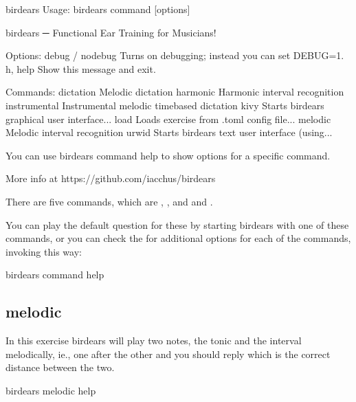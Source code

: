 \documentclass[letterpaper,10pt,english]{sphinxmanual}
\begin{document}
\begin{sphinxVerbatim}[commandchars=\\\{\}]
\PYGZdl{} birdears
Usage: birdears  \PYGZlt{}command\PYGZgt{} [options]

birdears ─ Functional Ear Training for Musicians!

Options:
  \PYGZhy{}\PYGZhy{}debug / \PYGZhy{}\PYGZhy{}no\PYGZhy{}debug  Turns on debugging; instead you can set DEBUG=1.
  \PYGZhy{}h, \PYGZhy{}\PYGZhy{}help            Show this message and exit.

Commands:
  dictation     Melodic dictation
  harmonic      Harmonic interval recognition
  instrumental  Instrumental melodic time\PYGZhy{}based dictation
  kivy          Starts birdears graphical user interface...
  load          Loads exercise from .toml config file...
  melodic       Melodic interval recognition
  urwid         Starts birdears text user interface (using...

  You can use \PYGZsq{}birdears \PYGZlt{}command\PYGZgt{} \PYGZhy{}\PYGZhy{}help\PYGZsq{} to show options for a specific
  command.

  More info at https://github.com/iacchus/birdears
\end{sphinxVerbatim}

There are five commands, which are , ,  and
 and .

You can play the default question for these by starting birdears with one of
these commands, or you can check the  for additional options for each
of the commands, invoking this way:

\begin{sphinxVerbatim}[commandchars=\\\{\}]
birdears \PYGZlt{}command\PYGZgt{} \PYGZhy{}\PYGZhy{}help
\end{sphinxVerbatim}


\subsection{melodic}
\label{\detokenize{using:melodic}}
In this exercise birdears will play two notes, the tonic and the interval
melodically, ie., one after the other and you should reply which is the
correct distance between the two.

\begin{sphinxVerbatim}[commandchars=\\\{\}]
birdears melodic \PYGZhy{}\PYGZhy{}help
\end{sphinxVerbatim}
\end{document}
